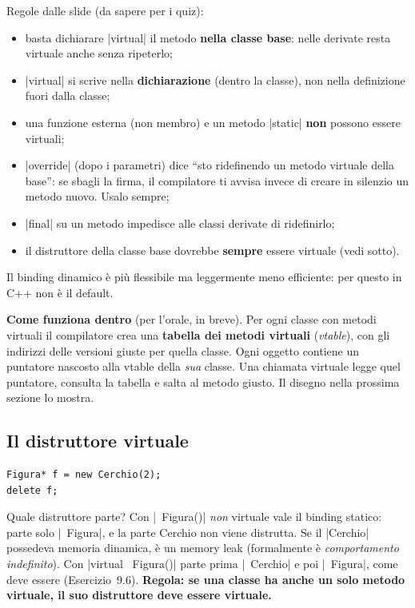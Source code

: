 Regole dalle slide (da sapere per i quiz):
\begin{itemize}
  \item basta dichiarare \cc|virtual| il metodo \textbf{nella classe base}: nelle
        derivate resta virtuale anche senza ripeterlo;
  \item \cc|virtual| si scrive nella \textbf{dichiarazione} (dentro la classe), non
        nella definizione fuori dalla classe;
  \item una funzione esterna (non membro) e un metodo \cc|static| \textbf{non} possono
        essere virtuali;
  \item \cc|override| (dopo i parametri) dice ``sto ridefinendo un metodo virtuale
        della base'': se sbagli la firma, il compilatore ti avvisa invece di creare in
        silenzio un metodo nuovo. Usalo sempre;
  \item \cc|final| su un metodo impedisce alle classi derivate di ridefinirlo;
  \item il distruttore della classe base dovrebbe \textbf{sempre} essere virtuale
        (vedi sotto).
\end{itemize}
Il binding dinamico è più flessibile ma leggermente meno efficiente: per questo in C++
non è il default.

\textbf{Come funziona dentro} (per l'orale, in breve). Per ogni classe con metodi
virtuali il compilatore crea una \textbf{tabella dei metodi virtuali} (\emph{vtable}),
con gli indirizzi delle versioni giuste per quella classe. Ogni oggetto contiene un
puntatore nascosto alla vtable della \emph{sua} classe. Una chiamata virtuale legge
quel puntatore, consulta la tabella e salta al metodo giusto. Il disegno nella prossima
sezione lo mostra.

\subsection*{Il distruttore virtuale}

\begin{lstlisting}
Figura* f = new Cerchio(2);
delete f;
\end{lstlisting}
Quale distruttore parte? Con \cc|~Figura()| \emph{non} virtuale vale il binding
statico: parte solo \cc|~Figura|, e la parte Cerchio non viene distrutta. Se il
\cc|Cerchio| possedeva memoria dinamica, è un memory leak (formalmente è
\emph{comportamento indefinito}). Con \cc|virtual ~Figura()| parte prima
\cc|~Cerchio| e poi \cc|~Figura|, come deve essere (Esercizio~9.6).
\textbf{Regola: se una classe ha anche un solo metodo virtuale, il suo distruttore deve
essere virtuale.}

